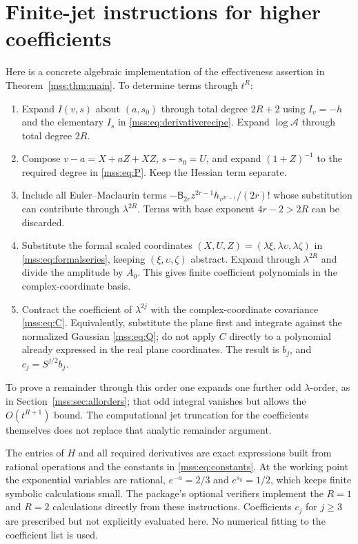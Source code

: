 \documentclass[11pt,letterpaper]{article}
\numberwithin{equation}{section}
\theoremstyle{definition}\newtheorem{definition}[theorem]{Definition}
\theoremstyle{remark}\newtheorem{remark}[theorem]{Remark}
\begin{document}
\section{Finite-jet instructions for higher coefficients}\label{mss:app:algorithm}
Here is a concrete algebraic implementation of the effectiveness assertion in Theorem~\ref{mss:thm:main}. To determine terms through $t^R$:
\begin{enumerate}[leftmargin=*,itemsep=3pt]
\item Expand $I(v,s)$ about $(a,s_0)$ through total degree $2R+2$ using $I_v=-h$ and the elementary $I_s$ in \eqref{mss:eq:derivativerecipe}. Expand $\log\mathcal A$ through total degree $2R$.
\item Compose $v-a=X+aZ+XZ$, $s-s_0=U$, and expand $(1+Z)^{-1}$ to the required degree in \eqref{mss:eq:P}. Keep the Hessian term separate.
\item Include all Euler--Maclaurin terms $-\mathsf B_{2r}z^{2r-1}h_{v^{2r-1}}/(2r)!$ whose substitution can contribute through $\lambda^{2R}$. Terms with base exponent $4r-2>2R$ can be discarded.
\item Substitute the formal scaled coordinates $(X,U,Z)=(\lambda\xi,\lambda\upsilon,\lambda\zeta)$ in \eqref{mss:eq:formalseries}, keeping $(\xi,\upsilon,\zeta)$ abstract. Expand through $\lambda^{2R}$ and divide the amplitude by $A_0$. This gives finite coefficient polynomials in the complex-coordinate basis.
\item Contract the coefficient of $\lambda^{2j}$ with the complex-coordinate covariance \eqref{mss:eq:C}. Equivalently, substitute the plane first and integrate against the normalized Gaussian \eqref{mss:eq:Q}; do not apply $C$ directly to a polynomial already expressed in the real plane coordinates. The result is $b_j$, and $c_j=S^{j/2}b_j$.
\end{enumerate}
To prove a remainder through this order one expands one further odd $\lambda$-order, as in Section~\ref{mss:sec:allorders}; that odd integral vanishes but allows the $O(t^{R+1})$ bound. The computational jet truncation for the coefficients themselves does not replace that analytic remainder argument.

The entries of $H$ and all required derivatives are exact expressions built from rational operations and the constants in \eqref{mss:eq:constants}. At the working point the exponential variables are rational, $e^{-a}=2/3$ and $e^{s_0}=1/2$, which keeps finite symbolic calculations small. The package's optional verifiers implement the $R=1$ and $R=2$ calculations directly from these instructions. Coefficients $c_j$ for $j\ge3$ are prescribed but not explicitly evaluated here. No numerical fitting to the coefficient list is used.
\end{document}
